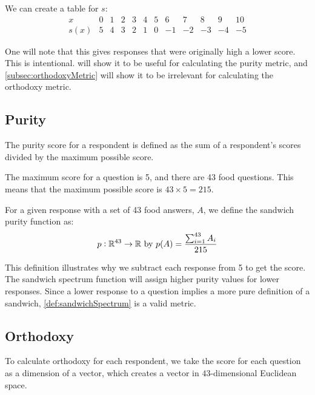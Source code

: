 We can create a table for $s$:
\begin{equation*}
	\begin{array}{l|r|r|r|r|r|r|r|r|r|r|r}
		x    & 0 & 1 & 2 & 3 & 4 & 5 &  6 &  7 &  8 &  9 & 10\\\hline
		s(x) & 5 & 4 & 3 & 2 & 1 & 0 & -1 & -2 & -3 & -4 & -5
	\end{array}
\end{equation*}

One will note that this gives responses that were originally high a lower score.
This is intentional.
 will show it to be useful for calculating the purity metric, and \vref{subsec:orthodoxyMetric} will show it to be irrelevant for calculating the orthodoxy metric.

\subsection{Purity}\label{subsec:purityMetric}
The purity score for a respondent is defined as the sum of a respondent's scores divided by the maximum possible score.

The maximum score for a question is 5, and there are 43 food questions.
This means that the maximum possible score is $43 \times 5 = 215$.

\begin{definition}
	For a given response with a set of 43 food answers, $A$, we define the sandwich purity function as:
	\begin{equation}
		p : \mathbb{R}^{43} \to \mathbb{R}\ \text{by}\ p(A) = \frac{\sum_{i = 1}^{43} A_i}{215}
	\end{equation}
\end{definition}

This definition illustrates why we subtract each response from 5 to get the score.
The sandwich spectrum function will assign higher purity values for lower responses.
Since a lower response to a question implies a more pure definition of a sandwich, \vref{def:sandwichSpectrum} is a valid metric.

\subsection{Orthodoxy}\label{subsec:orthodoxyMetric}
To calculate orthodoxy for each respondent, we take the score for each question as a dimension of a vector, which creates a vector in $43$-dimensional Euclidean space.

